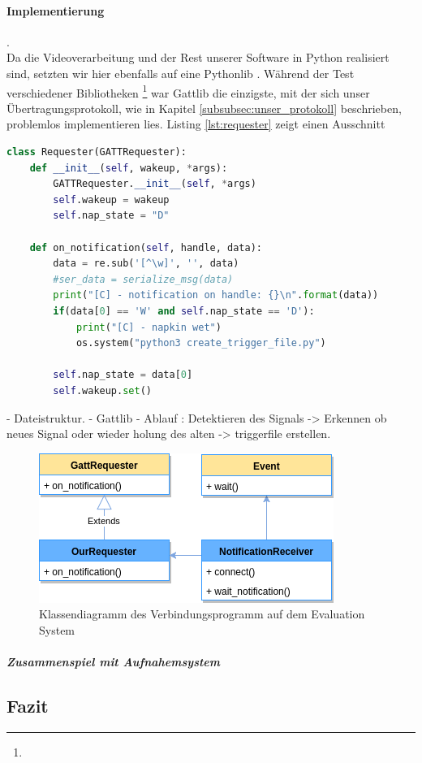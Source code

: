 \paragraph{Implementierung}. \\

Da die Videoverarbeitung und der Rest unserer Software in Python realisiert sind, setzten wir hier ebenfalls auf eine Pythonlib . Während der Test verschiedener Bibliotheken \footnote{} war Gattlib die einzigste, mit der sich unser Übertragungsprotokoll, wie in Kapitel \ref{subsubsec:unser_protokoll} beschrieben, problemlos implementieren lies. Listing \ref{lst:requester} zeigt einen Ausschnitt 

\begin{lstlisting}[language=Python, caption=Requester Class zur Verarbeitung der einkommenden Daten, label=lst:requester]
class Requester(GATTRequester):
    def __init__(self, wakeup, *args):
        GATTRequester.__init__(self, *args)
        self.wakeup = wakeup
        self.nap_state = "D"

    def on_notification(self, handle, data):
        data = re.sub('[^\w]', '', data)
        #ser_data = serialize_msg(data)
        print("[C] - notification on handle: {}\n".format(data))
        if(data[0] == 'W' and self.nap_state == 'D'):
            print("[C] - napkin wet")
            os.system("python3 create_trigger_file.py")
            
        self.nap_state = data[0]
        self.wakeup.set()
\end{lstlisting}

- Dateistruktur. 
- Gattlib
- Ablauf : Detektieren des Signals -> Erkennen ob neues Signal oder wieder holung des alten
  -> triggerfile erstellen.
  

\begin{figure}
  \centering
  \includegraphics{includes/kom/graphics/gatt_classDiagram2}
  \caption{Klassendiagramm des Verbindungsprogramm auf dem Evaluation System}
  \label{fig:classdiagram_connection}
\end{figure}


\subparagraph{Zusammenspiel mit Aufnahemsystem}


\subsection{Fazit}
